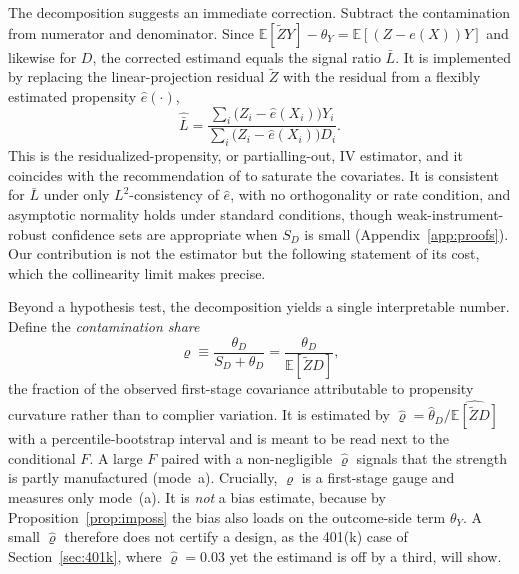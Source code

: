 \documentclass[11pt]{article}
\theoremstyle{plain}
\theoremstyle{definition}
\newcommand{\E}{\mathbb{E}}
\newcommand{\Lb}{\bar{L}}
\newcommand{\Zt}{\tilde{Z}}
\begin{document}
The decomposition suggests an immediate correction. Subtract the contamination from numerator and denominator. Since $\E[\Zt Y]-\theta_Y=\E[(Z-e(X))Y]$ and likewise for $D$, the corrected estimand equals the signal ratio $\Lb$. It is implemented by replacing the linear-projection residual $\Zt$ with the residual from a flexibly estimated propensity $\hat e(\cdot)$,
\begin{equation}\label{eq:corrected}
\hat\Lb=\frac{\sum_i\big(Z_i-\hat e(X_i)\big)Y_i}{\sum_i\big(Z_i-\hat e(X_i)\big)D_i}.
\end{equation}
This is the residualized-propensity, or partialling-out, IV estimator, and it coincides with the recommendation of \citet{blandhol2022} to saturate the covariates. It is consistent for $\Lb$ under only $L^2$-consistency of $\hat e$, with no orthogonality or rate condition, and asymptotic normality holds under standard conditions, though weak-instrument-robust confidence sets are appropriate when $S_D$ is small (Appendix~\ref{app:proofs}). Our contribution is not the estimator but the following statement of its cost, which the collinearity limit makes precise.

Beyond a hypothesis test, the decomposition yields a single interpretable number. Define the \emph{contamination share}
\begin{equation}\label{eq:share}
\varrho\equiv\frac{\theta_D}{S_D+\theta_D}=\frac{\theta_D}{\E[\Zt D]},
\end{equation}
the fraction of the observed first-stage covariance attributable to propensity curvature rather than to complier variation. It is estimated by $\hat\varrho=\hat\theta_D/\widehat{\E[\Zt D]}$ with a percentile-bootstrap interval and is meant to be read next to the conditional $F$. A large $F$ paired with a non-negligible $\hat\varrho$ signals that the strength is partly manufactured (mode~a). Crucially, $\varrho$ is a first-stage gauge and measures only mode~(a). It is \emph{not} a bias estimate, because by Proposition~\ref{prop:imposs} the bias also loads on the outcome-side term $\theta_Y$. A small $\hat\varrho$ therefore does not certify a design, as the 401(k) case of Section~\ref{sec:401k}, where $\hat\varrho=0.03$ yet the estimand is off by a third, will show.
\end{document}
